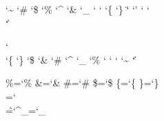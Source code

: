 \startcatcodetable \notcatcodes %
    \catcode\tabasciicode      \spacecatcode
    \catcode\endoflineasciicode\endoflinecatcode
    \catcode\formfeedasciicode \endoflinecatcode
    \catcode\spaceasciicode    \spacecatcode
    \catcode\endoffileasciicode\ignorecatcode
    \catcode`\~                \othercatcode
    \catcode`\#                \othercatcode
    \catcode`\$                \othercatcode
    \catcode`\%                \othercatcode
    \catcode`\^                \othercatcode
    \catcode`\&                \othercatcode
    \catcode`\_                \othercatcode
    \catcode`\<                \othercatcode
    \catcode`\>                \othercatcode
    \catcode`\{                \othercatcode
    \catcode`\}                \othercatcode
    \catcode`\"                \othercatcode
    \catcode`\'                \othercatcode
    \catcode`\/                \othercatcode
    \catcode`\\                \othercatcode
    \catcode`\|                \othercatcode
\stopcatcodetable

\startcatcodetable \vrbcatcodes %
    \catcode\tabasciicode      \othercatcode
    \catcode\endoflineasciicode\othercatcode
    \catcode\formfeedasciicode \othercatcode
    \catcode\spaceasciicode    \othercatcode
    \catcode\endoffileasciicode\othercatcode
\stopcatcodetable

\startcatcodetable \prtcatcodes
    \catcode\tabasciicode      \spacecatcode
    \catcode\endoflineasciicode\endoflinecatcode
    \catcode\formfeedasciicode \endoflinecatcode
    \catcode\spaceasciicode    \spacecatcode
    \catcode\endoffileasciicode\ignorecatcode
    \catcode`\\                \escapecatcode
    \catcode`\{                \begingroupcatcode
    \catcode`\}                \endgroupcatcode
    \catcode`\$                \mathshiftcatcode
    \catcode`\&                \alignmentcatcode
    \catcode`\#                \parametercatcode
    \catcode`\^                \superscriptcatcode
    \catcode`\_                \subscriptcatcode
    \catcode`\%                \commentcatcode
    \catcode`\@                {}
    \catcode`\!                
    \catcode`\?                
    \catcode`\~                \activecatcode
    \catcode`\|                \activecatcode
\stopcatcodetable


\chardef\%=`\%
\chardef\&=`\&
\chardef\#=`\#
\chardef\$=`\$
\chardef\{=`\{
\chardef\}=`\}
\chardef\\=`\\
\chardef\^=`\^
\chardef\_=`\_ %

\def\_{\dontleavehmode \kern.06em \vbox{\hrule width.3em}}


\def\unprotect {\pushcatcodetable\setcatcodetable\prtcatcodes}
\def\protect   {\popcatcodetable}

\endinput
